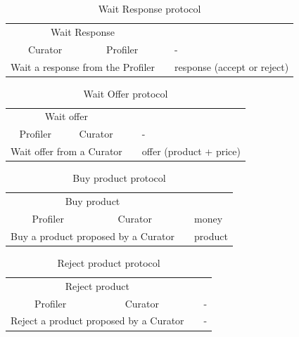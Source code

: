 \documentclass[a4paper,11pt]{report}
\begin{document}
    \begin{table}[ht!]
  \centering
  \begin{tabular}{|c|l|c|l|ll}
  \cline{1-4}
  \multicolumn{4}{|c|}{Wait Response}   &  &  \\ \cline{1-4}
  \multicolumn{2}{|C{3.5cm}|}{Curator} & \multicolumn{2}{C{3.5cm}|}{Profiler} &  & - \\ \cline{1-5}
  \multicolumn{4}{|m{7cm}|}{Wait a response from the Profiler}  &  & response (accept or reject) \\ \cline{1-5}
  \end{tabular}
  \caption{Wait Response protocol}
  \label{table:wait_response_protocol}
  \end{table}
  
  \begin{table}[ht!]
  \centering
  \begin{tabular}{|c|l|c|l|ll}
  \cline{1-4}
  \multicolumn{4}{|c|}{Wait offer}   &  &  \\ \cline{1-4}
  \multicolumn{2}{|C{3.5cm}|}{Profiler} & \multicolumn{2}{C{3.5cm}|}{Curator} &  & - \\ \cline{1-5}
  \multicolumn{4}{|m{7cm}|}{Wait offer from a Curator}  &  & offer (product + price) \\ \cline{1-5}
  \end{tabular}
  \caption{Wait Offer protocol}
  \label{table:wait_offer_protocol}
  \end{table}
  
  \begin{table}[ht!]
  \centering
  \begin{tabular}{|c|l|c|l|ll}
  \cline{1-4}
  \multicolumn{4}{|c|}{Buy product}   &  &  \\ \cline{1-4}
  \multicolumn{2}{|C{3.5cm}|}{Profiler} & \multicolumn{2}{C{3.5cm}|}{Curator} &  & money \\ \cline{1-5}
  \multicolumn{4}{|m{7cm}|}{Buy a product proposed by a Curator}  &  & product \\ \cline{1-5}
  \end{tabular}
  \caption{Buy product protocol}
  \label{table:buy_product_protocol}
  \end{table}
  
  \begin{table}[ht!]
  \centering
  \begin{tabular}{|c|l|c|l|ll}
  \cline{1-4}
  \multicolumn{4}{|c|}{Reject product}   &  &  \\ \cline{1-4}
  \multicolumn{2}{|C{3.5cm}|}{Profiler} & \multicolumn{2}{C{3.5cm}|}{Curator} &  & - \\ \cline{1-5}
  \multicolumn{4}{|m{7cm}|}{Reject a product proposed by a Curator}  &  & - \\ \cline{1-5}
  \end{tabular}
  \caption{Reject product protocol}
  \label{table:reject_product_protocol}
  \end{table}
  
\end{document}
